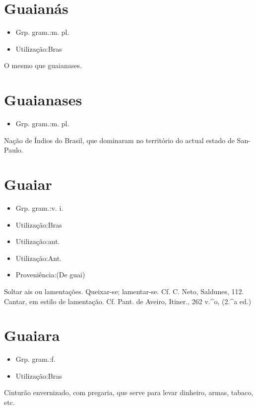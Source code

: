 \section{Guaianás}
\begin{itemize}
\item {Grp. gram.:m. pl.}
\end{itemize}
\begin{itemize}
\item {Utilização:Bras}
\end{itemize}
O mesmo que \textunderscore guaianases\textunderscore .
\section{Guaianases}
\begin{itemize}
\item {Grp. gram.:m. pl.}
\end{itemize}
Nação de Índios do Brasil, que dominaram no território do actual estado de San-Paulo.
\section{Guaiar}
\begin{itemize}
\item {Grp. gram.:v. i.}
\end{itemize}
\begin{itemize}
\item {Utilização:Bras}
\end{itemize}
\begin{itemize}
\item {Utilização:ant.}
\end{itemize}
\begin{itemize}
\item {Utilização:Ant.}
\end{itemize}
\begin{itemize}
\item {Proveniência:(De \textunderscore guai\textunderscore )}
\end{itemize}
Soltar ais ou lamentações.
Queixar-se; lamentar-se. Cf. C. Neto, \textunderscore Saldunes\textunderscore , 112.
Cantar, em estilo de lamentação. Cf. Pant. de Aveiro, \textunderscore Itiner.\textunderscore , 262 v.^o, (2.^a ed.)
\section{Guaiara}
\begin{itemize}
\item {Grp. gram.:f.}
\end{itemize}
\begin{itemize}
\item {Utilização:Bras}
\end{itemize}
Cinturão envernizado, com pregaria, que serve para levar dinheiro, armas, tabaco, etc.
